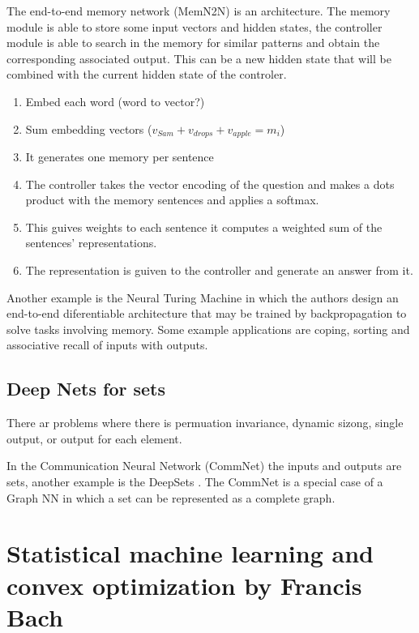 \documentclass[b5paper]{report}
\begin{document}
The end-to-end memory network (MemN2N) \cite{SukhbaatarSWF15} is an
architecture. The memory module is able to store some input vectors and hidden
states, the controller module is able to search in the memory for similar
patterns and obtain the corresponding associated output. This can be a new
hidden state that will be combined with the current hidden state of the
controler.

\begin{enumerate}
  \item Embed each word (word to vector?)
  \item Sum embedding vectors ($v_{Sam} + v_{drops} + v_{apple} = m_i$)
  \item It generates one memory per sentence
  \item The controller takes the vector encoding of the question and makes a
    dots product with the memory sentences and applies a softmax.
  \item This guives weights to each sentence it computes a weighted sum of
      the sentences' representations.
  \item The representation is guiven to the controller and generate an answer
    from it.
\end{enumerate}

Another example is the Neural Turing Machine \cite{graves2014neural} in which
the authors design an end-to-end diferentiable architecture that may be trained
by backpropagation to solve tasks involving memory. Some example applications
are coping, sorting and associative recall of inputs with outputs.

\section{Deep Nets for sets}

There ar problems where there is permuation invariance, dynamic sizong, single
output, or output for each element.

In the Communication Neural Network (CommNet) \cite{sukhbaatar2016} the inputs
and outputs are sets, another example is the DeepSets \cite{zaheer2017deep}.
The CommNet is a special case of a Graph NN in which a set can be represented
as a complete graph.



\chapter{Statistical machine learning and convex optimization by Francis Bach}
\end{document}
